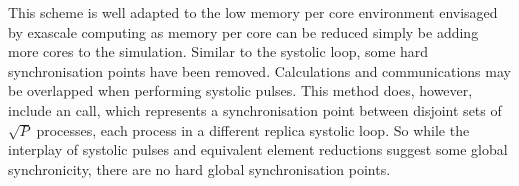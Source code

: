 This scheme is well adapted to the low memory per core environment
envisaged by exascale computing as memory per core can be reduced
simply be adding more cores to the simulation.
%
Similar to the systolic loop, some hard synchronisation points have been
removed.
%
Calculations and communications may be overlapped when performing
systolic pulses.
%
This method does, however, include an \mpiallreduce{} call, which represents
a synchronisation point between disjoint sets of $\sqrt{P}$ processes,
each process in a different replica systolic loop.
%
So while the interplay of systolic pulses and equivalent element reductions
suggest some global synchronicity, there are no hard
global synchronisation points.
